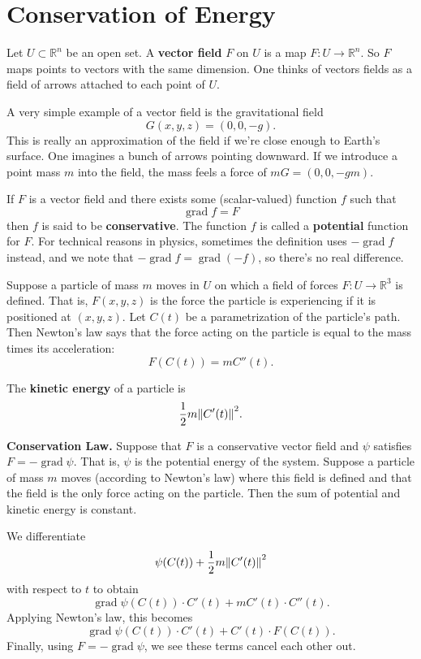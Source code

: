 \documentclass{article}
\DeclareMathOperator{\grd}{grad}
\begin{document}
\section*{Conservation of Energy}
Let $U \subset \mathbb{R}^n$ be an open set. A \textbf{vector field} $F$ on $U$ is a map 
$F: U \to \mathbb{R}^n$. So $F$ maps points to vectors with the same dimension. 
One thinks of vectors fields as a field of arrows attached to each point of $U$. 

A very simple example of a vector field is the gravitational field 
\[G(x,y,z) = (0,0,-g).\]
This is really an approximation of the field if we're close enough to 
Earth's surface. One imagines a bunch of arrows pointing downward. 
If we introduce a point mass $m$ into the
field, the mass feels a force of $mG = (0,0,-gm)$. 

If $F$ is a vector field and there exists some (scalar-valued) function $f$ such that
\[\grd f = F\]
then $f$ is said to be \textbf{conservative}. The function $f$ is called a \textbf{potential} function
for $F$. For technical reasons in physics, sometimes the definition uses
$-\grd f$ instead, and we note that $-\grd f = \grd(-f)$, so there's no real difference.

Suppose a particle of mass $m$ moves in $U$ on which a field of forces $F: U \to \mathbb{R}^3$ is defined.
That is, $F(x,y,z)$ is the force the particle is experiencing if it is positioned at $(x,y,z)$.
Let $C(t)$ be a parametrization of the particle's path. Then Newton's law says that the force acting on the 
particle is equal to the mass times its acceleration:
\[F(C(t)) = mC''(t).\]

The \textbf{kinetic energy} of a particle is 
\[\frac{1}{2} m \norm{C'(t)}^2.\]

\textbf{Conservation Law.} Suppose that $F$ is a conservative vector field and $\psi$ satisfies
$F = -\grd \psi$. That is, $\psi$ is the potential energy of the system. Suppose a particle of mass $m$ moves 
(according to Newton's law) where this field is defined and that the field is the only force acting on the particle. 
Then the sum of potential and kinetic energy is constant.

We differentiate
\[ \psi(C(t)) +  \frac{1}{2} m \norm{C'(t)}^2\]
with respect to $t$ to obtain 
\[ \grd\psi(C(t))\cdot C'(t) + m C'(t) \cdot C''(t). \]
Applying Newton's law, this becomes
\[ \grd\psi(C(t))\cdot C'(t) + C'(t) \cdot F(C(t)). \]
Finally, using $F = -\grd \psi$, we see these terms cancel each other out.
\end{document}
